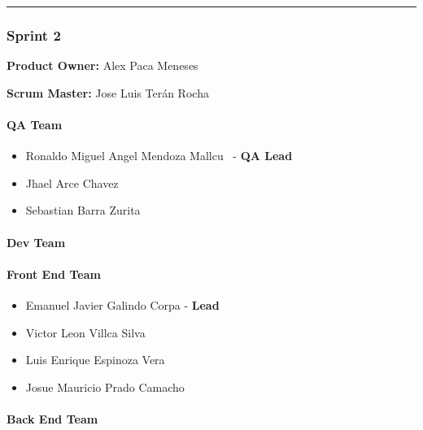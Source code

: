 \begin{center}\rule{0.5\linewidth}{0.5pt}\end{center}

\hypertarget{sprint2}{
\subsubsection{\texorpdfstring{\textbf{Sprint
2}}{Sprint 2}}\label{sprint2}}

\textbf{Product Owner: }
Alex Paca Meneses

\textbf{Scrum Master: }
Jose Luis Terán Rocha

\hypertarget{qateam-2}{
\paragraph{\texorpdfstring{\textbf{QA Team}}{QA Team}}\label{qateam-2}}

\begin{itemize}
\tightlist
\item
  Ronaldo Miguel Angel Mendoza Mallcu ~- \textbf{QA Lead}
\item
  Jhael Arce Chavez
\item
  Sebastian Barra Zurita
\end{itemize}

\hypertarget{devteam-2}{
\paragraph{\texorpdfstring{\textbf{Dev
Team}}{Dev Team}}\label{devteam-2}}

\paragraph{Front End Team}\label{front-end-team-2}

\begin{itemize}
\tightlist
\item
  Emanuel Javier Galindo Corpa - \textbf{Lead}
\item
  Victor Leon Villca Silva
\item
  Luis Enrique Espinoza Vera
\item
  Josue Mauricio Prado Camacho
\end{itemize}

\paragraph{Back End Team}\label{back-end-team-2}

